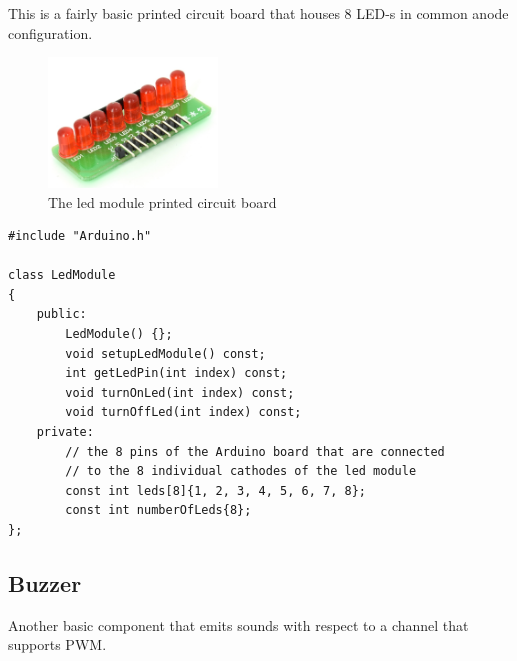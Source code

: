 \documentclass[12pt]{article}
\begin{document}
	This is a fairly basic printed circuit board that houses 8 LED-s in common anode configuration.

	\begin{figure}[ht]
		\centering
		\includegraphics[width=0.4\textwidth]{leds.png}
		\caption{The led module printed circuit board}
		\label{fig:led_module}
	\end{figure}

	\begin{lstlisting}[caption = C++ class definition of the LED module]
#include "Arduino.h"

class LedModule
{
	public:
		LedModule() {};
		void setupLedModule() const;
		int getLedPin(int index) const;
		void turnOnLed(int index) const;
		void turnOffLed(int index) const;
	private:
		// the 8 pins of the Arduino board that are connected
		// to the 8 individual cathodes of the led module
		const int leds[8]{1, 2, 3, 4, 5, 6, 7, 8};
		const int numberOfLeds{8};
};
	\end{lstlisting}
	
	\clearpage
	
	\subsection{Buzzer}
	Another basic component that emits sounds with respect to a channel that supports PWM. 
	
	
\end{document}
